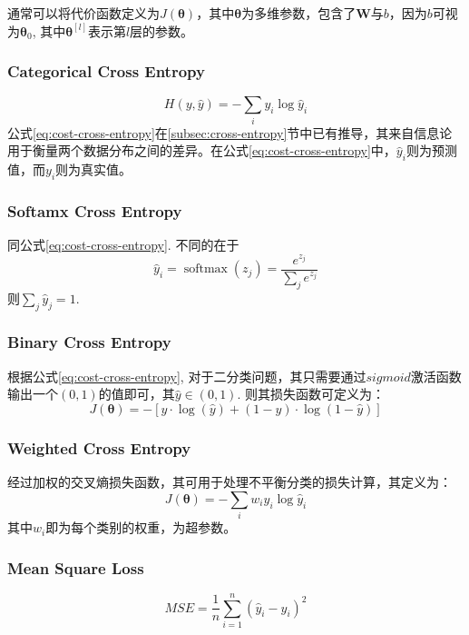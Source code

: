 通常可以将代价函数定义为$J(\boldsymbol{\theta})$，其中$\boldsymbol{\theta}$为多维参数，包含了$\mathbf{W}$与$b$，因为$b$可视为$\boldsymbol{\theta}_0$, 其中$\boldsymbol{\theta}^{[l]}$表示第$l$层的参数。

\subsubsection{Categorical Cross Entropy}
\begin{equation}
  H(y, \hat{y})=-\sum_{i} y_{i} \log \hat{y}_{i}
  \label{eq:cost-cross-entropy}
\end{equation}
公式\ref{eq:cost-cross-entropy}在\ref{subsec:cross-entropy}节中已有推导，其来自信息论用于衡量两个数据分布之间的差异。在公式\ref{eq:cost-cross-entropy}中，$\hat{y}_{i}$则为预测值，而$y_i$则为真实值。

\subsubsection{Softamx Cross Entropy}
同公式\ref{eq:cost-cross-entropy}. 不同的在于
$$\hat{y}_i=\operatorname{softmax}\left(z_{j}\right)=\frac{e^{z_{j}}}{\sum \limits_{j} e^{z_{j}}}$$
则$\sum \limits_j \hat{y}_j= 1$. 

\subsubsection{Binary Cross Entropy}
根据公式\ref{eq:cost-cross-entropy}, 对于二分类问题，其只需要通过$sigmoid$激活函数输出一个$(0,1)$的值即可，其$\hat{y} \in (0, 1)$. 则其损失函数可定义为：
\begin{equation}
  J(\boldsymbol{\theta})=-[y \cdot \log (\hat{y})+(1-y) \cdot \log (1-\hat{y})]
  \label{eq:cost-binary-cross-entropy}
\end{equation}


\subsubsection{Weighted Cross Entropy}
经过加权的交叉熵损失函数，其可用于处理不平衡分类的损失计算，其定义为：
\begin{equation}
  J(\boldsymbol{\theta}) = -\sum \limits _i  w_i y_i \log \hat{y}_i
  \label{eq:cost-weighted-cross-entropy}
\end{equation}
其中$w_i$即为每个类别的权重，为超参数。

\subsubsection{Mean Square Loss}
\begin{equation}
  M S E=\frac{1}{n} \sum_{i=1}^{n}\left(\hat{y}_{i}-y_{i}\right)^{2}
  \label{eq:cost-mse}
\end{equation}

